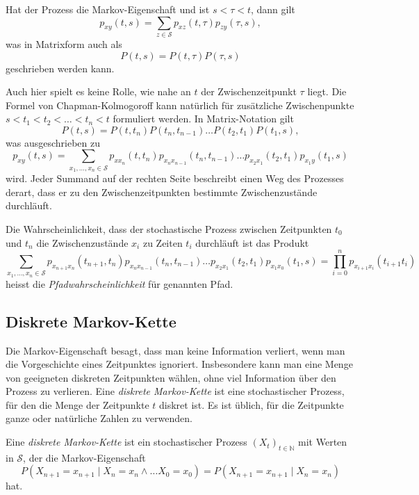 \begin{satz}
Hat der Prozess die Markov-Eigenschaft und ist $s<\tau <t$, dann gilt
\[
p_{xy}(t,s) = \sum_{z\in\mathcal{S}} p_{xz}(t,\tau) p_{zy}(\tau,s),
\]
was in Matrixform auch als
\[
P(t,s) = P(t,\tau)P(\tau,s)
\]
geschrieben werden kann.
\end{satz}

Auch hier spielt es keine Rolle, wie nahe an $t$ der Zwischenzeitpunkt
$\tau$ liegt.
Die Formel von Chapman-Kolmogoroff kann natürlich für zusätzliche
Zwischenpunkte $s<t_1<t_2<\dots< t_n< t$ formuliert werden.
In Matrix-Notation gilt
\[
P(t,s) = P(t,t_n)P(t_n,t_{n-1})\dots P(t_2,t_1)P(t_1,s),
\]
was ausgeschrieben zu
\[
p_{xy}(t,s)
=
\sum_{x_1,\dots,x_n\in\mathcal{S}}
p_{xx_n}(t,t_n)
p_{x_nx_{n-1}}(t_n,t_{n-1})
\dots
p_{x_2x_1}(t_2,t_1)
p_{x_1y}(t_1,s)
\]
wird.
Jeder Summand auf der rechten Seite beschreibt einen Weg des Prozesses
derart, dass er zu den Zwischenzeitpunkten bestimmte 
Zwischenzustände durchläuft.

\begin{definition}
Die Wahrscheinlichkeit, dass der stochastische Prozess zwischen Zeitpunkten
$t_0$ und $t_n$ die Zwischenzustände $x_i$ zu Zeiten $t_i$ durchläuft ist
das Produkt
\[
\sum_{x_1,\dots,x_n\in\mathcal{S}}
p_{x_{n+1}x_n}(t_{n+1},t_n)
p_{x_nx_{n-1}}(t_n,t_{n-1})
\dots
p_{x_2x_1}(t_2,t_1)
p_{x_1x_0}(t_1,s)
=
\prod_{i=0}^{n}
p_{x_{i+1}x_i}(t_{i+1}t_i)
\]
heisst die {\em Pfadwahrscheinlichkeit} für genannten Pfad.
%
\end{definition}

%
%
\subsection{Diskrete Markov-Kette}
Die Markov-Eigenschaft besagt, dass man keine Information verliert,
wenn man die Vorgeschichte eines Zeitpunktes ignoriert.
Insbesondere kann man eine Menge von geeigneten diskreten
Zeitpunkten wählen, ohne viel Information über den Prozess zu
verlieren.
Eine {\em diskrete Markov-Kette} ist eine stochastischer Prozess,
für den die Menge der Zeitpunkte $t$ diskret ist.
Es ist üblich, für die Zeitpunkte ganze oder natürliche Zahlen zu
verwenden.

\begin{definition}
Eine {\em diskrete Markov-Kette} ist ein stochastischer Prozess
$(X_t)_{t\in\mathbb{N}}$ mit Werten in $\mathcal{S}$, der die
Markov-Eigenschaft
\[
P(X_{n+1}=x_{n+1}\mid X_n=x_n\wedge\dots X_0=x_0)
=
P(X_{n+1}=x_{n+1}\mid X_n=x_n)
\]
hat.
\end{definition}
%
%

